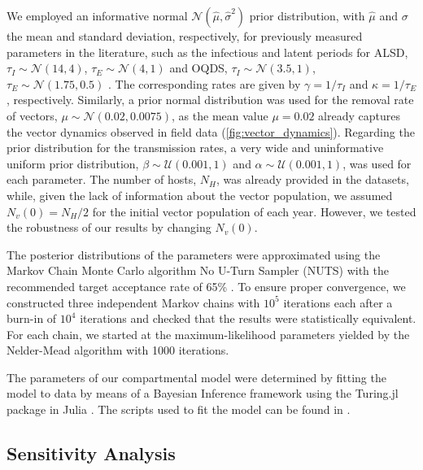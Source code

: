 We employed an informative normal $\mathcal{N}(\hat{\mu},\hat{\sigma}^2)$
prior distribution, with $\hat{\mu}$ and $\sigma$ the mean and standard
deviation, respectively, for previously measured parameters in the literature,
such as the infectious and latent periods for ALSD, $\tau_I\sim\mathcal{N}(14,
    4)$, $\tau_E\sim\mathcal{N}(4, 1)$ \cite{teviotdale2003almond,
    Moralejo2020} and OQDS, $\tau_I\sim\mathcal{N}(3.5, 1)$,
$\tau_E\sim\mathcal{N}(1.75, 0.5)$ \cite{Fierro2019}. The corresponding rates
are given by $\gamma=1/\tau_I$ and $\kappa=1/\tau_E$, respectively. Similarly,
a prior normal distribution was used for the removal rate of vectors,
$\mu\sim\mathcal{N}(0.02, 0.0075)$, as the mean value $\mu=0.02$ already
captures the vector dynamics observed in field data
(\cref{fig:vector_dynamics}). Regarding the prior distribution for
the transmission rates, a very wide and uninformative uniform prior
distribution, $\beta\sim \mathcal{U}(0.001, 1)$ and
$\alpha\sim\mathcal{U}(0.001, 1)$, was used for each parameter. The number of
hosts, $N_H$, was already provided in the datasets, while, given the lack of
information about the vector population, we assumed $N_v(0)=N_H/2$ for the
initial vector population of each year. However, we tested the robustness of
our results by changing $N_v(0)$.

The posterior distributions of the parameters were approximated using the
Markov Chain Monte Carlo algorithm No U-Turn Sampler (NUTS) with the
recommended target acceptance rate of 65\% \cite{Homan2014}. To ensure
proper convergence, we constructed three independent Markov chains with $10^5$
iterations each after a burn-in of $10^4$ iterations and checked that the
results were statistically equivalent. For each chain, we started at the
maximum-likelihood parameters yielded by the Nelder-Mead algorithm with 1000
iterations.

The parameters of our compartmental model were determined by fitting the
model to data by means of a Bayesian Inference framework using the Turing.jl
package \cite{Turing.jl} in Julia \cite{julia}. The scripts used to fit the
model can be found in \cite{CODE}.

\subsection{Sensitivity Analysis}


